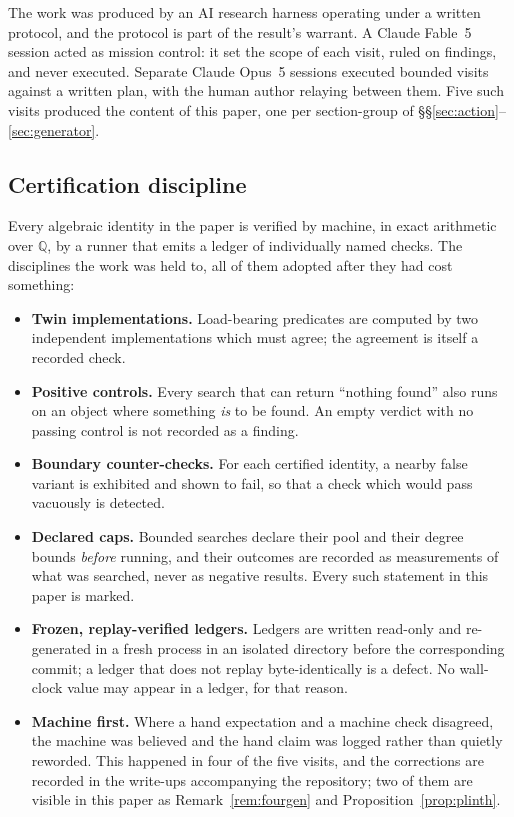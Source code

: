 \documentclass[11pt]{article}
\theoremstyle{definition}
\theoremstyle{remark}
\newcommand{\Q}{\mathbb{Q}}
\begin{document}
The work was produced by an AI research harness operating under a written
protocol, and the protocol is part of the result's warrant. A Claude Fable~5
session acted as mission control: it set the scope of each visit,
ruled on findings, and never executed. Separate Claude Opus~5 sessions
executed bounded visits against a written plan, with the human author relaying
between them. Five such visits produced the content of this paper, one per
section-group of \S\S\ref{sec:action}--\ref{sec:generator}.

\subsection{Certification discipline}

Every algebraic identity in the paper is verified by machine, in exact
arithmetic over $\Q$, by a runner that emits a ledger of individually named
checks. The disciplines the work was held to, all of them adopted after they
had cost something:

\begin{itemize}
\item \textbf{Twin implementations.} Load-bearing predicates are computed by
two independent implementations which must agree; the agreement is itself a
recorded check.
\item \textbf{Positive controls.} Every search that can return ``nothing
found'' also runs on an object where something \emph{is} to be found. An empty
verdict with no passing control is not recorded as a finding.
\item \textbf{Boundary counter-checks.} For each certified identity, a nearby
false variant is exhibited and shown to fail, so that a check which would pass
vacuously is detected.
\item \textbf{Declared caps.} Bounded searches declare their pool and their
degree bounds \emph{before} running, and their outcomes are recorded as
measurements of what was searched, never as negative results. Every such
statement in this paper is marked.
\item \textbf{Frozen, replay-verified ledgers.} Ledgers are written read-only
and re-generated in a fresh process in an isolated directory before the
corresponding commit; a ledger that does not replay byte-identically is a
defect. No wall-clock value may appear in a ledger, for that reason.
\item \textbf{Machine first.} Where a hand expectation and a machine check
disagreed, the machine was believed and the hand claim was logged rather than
quietly reworded. This happened in four of the five visits, and the
corrections are recorded in the write-ups accompanying the repository; two of
them are visible in this paper as Remark~\ref{rem:fourgen} and
Proposition~\ref{prop:plinth}.
\end{itemize}
\end{document}
